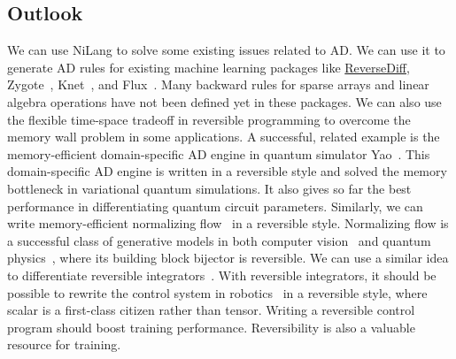 \documentclass{article}
\newcommand{\<}{\langle}
\renewcommand{\>}{\rangle}
\theoremstyle{definition}\newtheorem{definition}{\textit{Definition}}
\begin{document}
\subsection{Outlook}\label{sec:outlook}

We can use NiLang to solve some existing issues related to AD.
We can use it to generate AD rules for existing machine learning packages like \href{https://github.com/JuliaDiff/ReverseDiff.jl}{ReverseDiff}, Zygote~\cite{Innes2019}, Knet~\cite{Yuret2016}, and Flux~\cite{Innes2018a}.
Many backward rules for sparse arrays and linear algebra operations have not been defined yet in these packages.
We can also use the flexible time-space tradeoff in reversible programming to overcome the memory wall problem in some applications.
A successful, related example is the memory-efficient domain-specific AD engine in quantum simulator Yao~\cite{Luo2019}.
This domain-specific AD engine is written in a reversible style and solved the memory bottleneck in variational quantum simulations. It also gives so far the best performance in differentiating quantum circuit parameters.
Similarly, we can write memory-efficient normalizing flow~\cite{Kobyzev2019} in a reversible style. Normalizing flow is a successful class of generative models in both computer vision~\cite{Kingma2018} and quantum physics~\cite{Dinh2016,Li2018}, where its building block bijector is reversible.
We can use a similar idea to differentiate reversible integrators~\cite{Hut1995, Laikov2018}.
With reversible integrators, it should be possible to rewrite the control system in robotics~\cite{Giftthaler2017} in a reversible style, where scalar is a first-class citizen rather than tensor.
Writing a reversible control program should boost training performance.
Reversibility is also a valuable resource for training.
\end{document}
